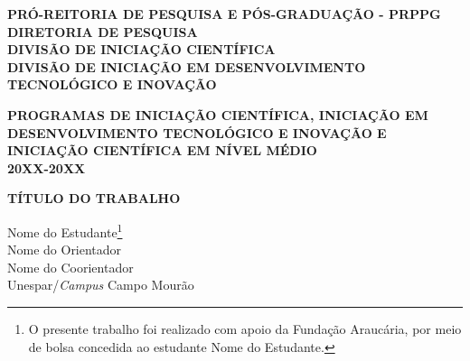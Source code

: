 \documentclass[12pt,a4paper]{article}
\begin{document}
\begin{center}
\textbf{PRÓ-REITORIA DE PESQUISA E PÓS-GRADUAÇÃO - PRPPG}\\
\textbf{DIRETORIA DE PESQUISA}\\
\textbf{DIVISÃO DE INICIAÇÃO CIENTÍFICA}\\
\textbf{DIVISÃO DE INICIAÇÃO EM DESENVOLVIMENTO TECNOLÓGICO E INOVAÇÃO}

\medskip
\textbf{PROGRAMAS DE INICIAÇÃO CIENTÍFICA, INICIAÇÃO EM DESENVOLVIMENTO TECNOLÓGICO E INOVAÇÃO E INICIAÇÃO CIENTÍFICA EM NÍVEL MÉDIO}\\
\textbf{20XX-20XX}

\bigskip
\textbf{TÍTULO DO TRABALHO}
\end{center}

\bigskip
\begin{flushright}
Nome do Estudante\footnote{O presente trabalho foi realizado com apoio da Fundação Araucária, por meio de bolsa concedida ao estudante Nome do Estudante.}\\
Nome do Orientador\\
Nome do Coorientador\\
Unespar/\textit{Campus} Campo Mourão
\end{flushright}

\bigskip\bigskip




\end{document}
